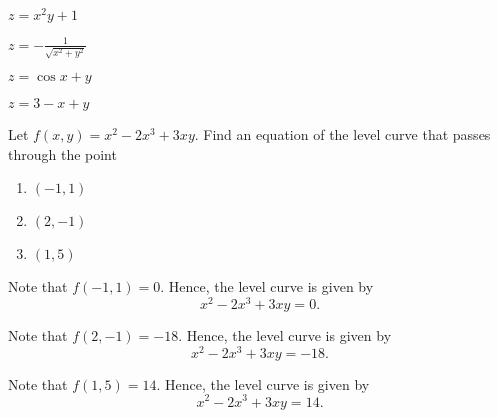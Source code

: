 \begin{solution}
    \begin{ppart}
        $z = x^2 y + 1$
    \end{ppart}
    \begin{ppart}
        $z = -\frac1{\sqrt{x^2 + y^2}}$
    \end{ppart}
    \begin{ppart}
        $z = \cos{x + y}$
    \end{ppart}
    \begin{ppart}
        $z = 3 - x + y$
    \end{ppart}
\end{solution}

\begin{problem}
    Let $f(x, y) = x^2 - 2x^3 + 3xy$. Find an equation of the level curve that passes through the point
    \begin{enumerate}
        \item $(-1, 1)$
        \item $(2, -1)$
        \item $(1, 5)$
    \end{enumerate}
\end{problem}
\begin{solution}
    \begin{ppart}
        Note that $f(-1, 1) = 0$. Hence, the level curve is given by \[x^2 - 2x^3 + 3xy = 0.\]
    \end{ppart}
    \begin{ppart}
        Note that $f(2, -1) = -18$. Hence, the level curve is given by \[x^2 - 2x^3 + 3xy = -18.\]
    \end{ppart}
    \begin{ppart}
        Note that $f(1, 5) = 14$. Hence, the level curve is given by \[x^2 - 2x^3 + 3xy = 14.\]
    \end{ppart}
\end{solution}

